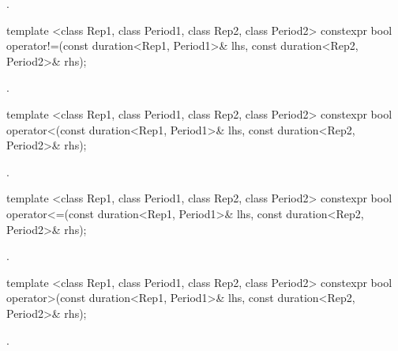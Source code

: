 \begin{itemdescr}
\pnum
\returns {}.
\end{itemdescr}

%
%
\begin{itemdecl}
template <class Rep1, class Period1, class Rep2, class Period2>
  constexpr bool operator!=(const duration<Rep1, Period1>& lhs, const duration<Rep2, Period2>& rhs);
\end{itemdecl}

\begin{itemdescr}
\pnum
\returns {}.
\end{itemdescr}

%
%
\begin{itemdecl}
template <class Rep1, class Period1, class Rep2, class Period2>
  constexpr bool operator<(const duration<Rep1, Period1>& lhs, const duration<Rep2, Period2>& rhs);
\end{itemdecl}

\begin{itemdescr}
\pnum
\returns {}.
\end{itemdescr}

%
%
\begin{itemdecl}
template <class Rep1, class Period1, class Rep2, class Period2>
  constexpr bool operator<=(const duration<Rep1, Period1>& lhs, const duration<Rep2, Period2>& rhs);
\end{itemdecl}

\begin{itemdescr}
\pnum
\returns {}.
\end{itemdescr}

%
%
\begin{itemdecl}
template <class Rep1, class Period1, class Rep2, class Period2>
  constexpr bool operator>(const duration<Rep1, Period1>& lhs, const duration<Rep2, Period2>& rhs);
\end{itemdecl}

\begin{itemdescr}
\pnum
\returns {}.
\end{itemdescr}


